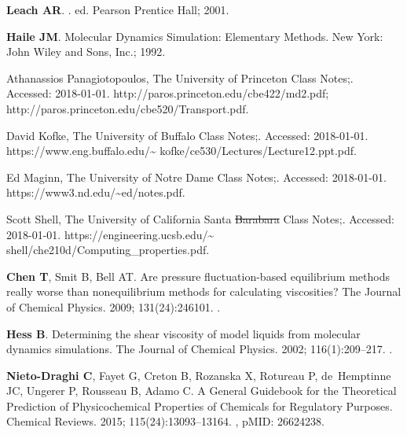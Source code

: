 \documentclass[9pt,bestpractices]{livecoms}
\providecommand{\DIFadd}[1]{{\protect\color{blue}\uwave{#1}}} %
\providecommand{\DIFdel}[1]{{\protect\color{red}\sout{#1}}}                      %
\providecommand{\DIFaddbegin}{} %
\providecommand{\DIFaddend}{} %
\providecommand{\DIFdelbegin}{} %
\providecommand{\DIFdelend}{} %
\begin{document}
\begin{thebibliography}{59}
\textbf{\color{LiveCoMSMediumGrey} Leach AR}.
.
 ed. Pearson Prentice Hall; 2001.

\textbf{\color{LiveCoMSMediumGrey} Haile JM}.
\newblock Molecular Dynamics Simulation: Elementary Methods.
\newblock New York: John Wiley and Sons, Inc.; 1992.

Athanassios Panagiotopoulos, The University of Princeton Class Notes;.
\newblock Accessed: 2018-01-01.
\newblock http://paros.princeton.edu/cbe422/md2.pdf;
  http://paros.princeton.edu/cbe520/Transport.pdf.

David Kofke, The University of Buffalo Class Notes;.
\newblock Accessed: 2018-01-01.
\newblock https://www.eng.buffalo.edu/\textasciitilde
  kofke/ce530/Lectures/Lecture12.ppt.pdf.

Ed Maginn, The University of Notre Dame Class Notes;.
\newblock Accessed: 2018-01-01.
\newblock https://www3.nd.edu/\textasciitilde ed/notes.pdf.

Scott Shell, The University of California Santa \DIFdelbegin \DIFdel{Barabara }\DIFdelend \DIFaddbegin \DIFadd{Barbara }\DIFaddend Class Notes;.
\newblock Accessed: 2018-01-01.
\newblock https://engineering.ucsb.edu/\textasciitilde
  shell/che210d/Computing\_properties.pdf.

\textbf{\color{LiveCoMSMediumGrey} Chen T}, Smit B, Bell AT.
\newblock Are pressure fluctuation-based equilibrium methods really worse than
  nonequilibrium methods for calculating viscosities?
\newblock The Journal of Chemical Physics.  2009; 131(24):246101.
\newblock \href{https://dx.doi.org/10.1063/1.3274802}{\doiprefix
  }.

\textbf{\color{LiveCoMSMediumGrey} Hess B}.
\newblock Determining the shear viscosity of model liquids from molecular
  dynamics simulations.
\newblock The Journal of Chemical Physics.  2002; 116(1):209--217.
\newblock \href{https://dx.doi.org/10.1063/1.1421362}{\doiprefix
  }.

\textbf{\color{LiveCoMSMediumGrey} Nieto-Draghi C}, Fayet G, Creton B, Rozanska
  X, Rotureau P, de~Hemptinne JC, Ungerer P, Rousseau B, Adamo C.
\newblock A General Guidebook for the Theoretical Prediction of Physicochemical
  Properties of Chemicals for Regulatory Purposes.
\newblock Chemical Reviews.  2015; 115(24):13093--13164.
\newblock \href{https://dx.doi.org/10.1021/acs.chemrev.5b00215}{\doiprefix
  }, pMID: 26624238.


\end{thebibliography}
\end{document}
